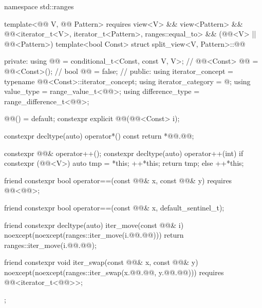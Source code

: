 \begin{codeblock}
namespace std::ranges {
  template<@@ V, @@ Pattern>
    requires view<V> && view<Pattern> &&
             @@<iterator_t<V>, iterator_t<Pattern>, ranges::equal_to> &&
             (@@<V> || @@<Pattern>)
  template<bool Const>
  struct split_view<V, Pattern>::@@ {
  private:
    using @@ = conditional_t<Const, const V, V>;      // \expos
    @@<Const> @@ = @@<Const>(); // \expos
    bool @@ = false;                          // \expos
  public:
    using iterator_concept  = typename @@<Const>::iterator_concept;
    using iterator_category = @\seebelow@;
    using value_type        = range_value_t<@@>;
    using difference_type   = range_difference_t<@@>;

    @@() = default;
    constexpr explicit @@(@@<Const> i);

    constexpr decltype(auto) operator*() const { return *@@.@@; }

    constexpr @@& operator++();
    constexpr decltype(auto) operator++(int) {
      if constexpr (@@<V>) {
        auto tmp = *this;
        ++*this;
        return tmp;
      } else
        ++*this;
    }

    friend constexpr bool operator==(const @@& x, const @@& y)
      requires @@<@@>;

    friend constexpr bool operator==(const @@& x, default_sentinel_t);

    friend constexpr decltype(auto) iter_move(const @@& i)
    noexcept(noexcept(ranges::iter_move(i.@@.@@))) {
      return ranges::iter_move(i.@@.@@);
    }

    friend constexpr void iter_swap(const @@& x, const @@& y)
      noexcept(noexcept(ranges::iter_swap(x.@@.@@, y.@@.@@)))
      requires @@<iterator_t<@@>>;
  };
}
\end{codeblock}


